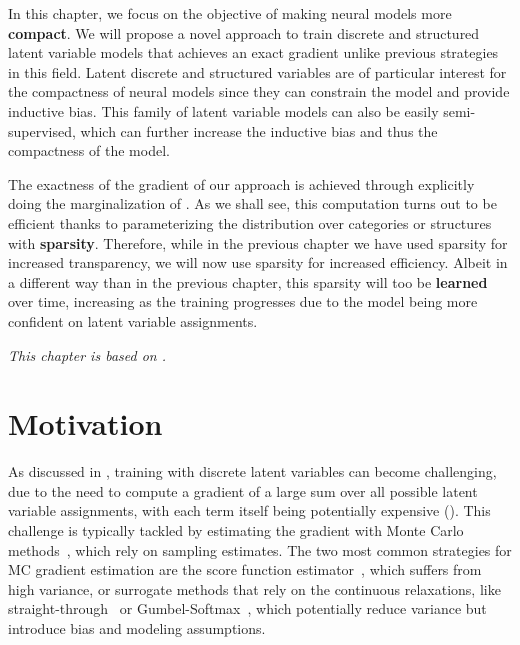 \label{chap:sparsemarg}

\cleardoublepage
\doublespacing

\noindent In this chapter, we focus on the objective of making neural models
more \textbf{compact}. We will propose a novel approach to train
discrete and structured latent variable models that achieves an exact
gradient unlike previous strategies in this field. Latent discrete
and structured variables are of particular interest for the compactness
of neural models since they can constrain the model and provide
inductive bias. This family of latent variable models can also be easily
semi-supervised, which can further increase the inductive bias and
thus the compactness of the model.

The exactness of the gradient of our approach is achieved through explicitly doing the
marginalization of . As we shall see, this computation turns out to be efficient thanks
to parameterizing the distribution over categories or structures with
\textbf{sparsity}. Therefore, while in the previous chapter we have
used sparsity for increased transparency, we will now use sparsity
for increased efficiency. Albeit in a different way than in the
previous chapter, this sparsity will too be \textbf{learned} over
time, increasing as the training progresses due to the model being
more confident on latent variable assignments.

\textit{This chapter is based on \citet*{correia2020procneurips}.}

\section{Motivation}
\label{sec:intro}

\noindent As discussed in , training with discrete latent variables can
become challenging, due to the need to compute a gradient of a large
sum over all possible latent variable assignments,
with each term
itself being potentially expensive (). This challenge is typically
tackled by estimating the gradient with Monte Carlo
methods~\citep[MC;][]{mohamed2019monte}, which rely on sampling
estimates. The two most common strategies for MC gradient estimation
are the score function
estimator~\citep[SFE;][]{rubinstein1976monte,paisley2012variational},
which suffers from high variance, or surrogate methods that rely on
the continuous relaxations, like straight-through~\citep{STE} or
Gumbel-Softmax~\citep{Concrete,GumbelSoftmax}, which potentially
reduce variance but introduce bias and modeling assumptions.

